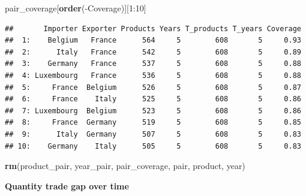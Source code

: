\documentclass[10pt,]{article}
\newenvironment{Shaded}{\begin{snugshade}}{\end{snugshade}}
\newcommand{\KeywordTok}[1]{\textcolor[rgb]{0.13,0.29,0.53}{\textbf{{#1}}}}
\newcommand{\DecValTok}[1]{\textcolor[rgb]{0.00,0.00,0.81}{{#1}}}
\newcommand{\NormalTok}[1]{{#1}}
\begin{document}
\begin{Shaded}
\begin{Highlighting}[]
\NormalTok{pair_coverage[}\KeywordTok{order}\NormalTok{(-Coverage)][}\DecValTok{1}\NormalTok{:}\DecValTok{10}\NormalTok{]}
\end{Highlighting}
\end{Shaded}

\begin{verbatim}
##       Importer Exporter Products Years T_products T_years Coverage
##  1:    Belgium   France      564     5        608       5     0.93
##  2:      Italy   France      542     5        608       5     0.89
##  3:    Germany   France      537     5        608       5     0.88
##  4: Luxembourg   France      536     5        608       5     0.88
##  5:     France  Belgium      526     5        608       5     0.87
##  6:     France    Italy      525     5        608       5     0.86
##  7: Luxembourg  Belgium      523     5        608       5     0.86
##  8:     France  Germany      519     5        608       5     0.85
##  9:      Italy  Germany      507     5        608       5     0.83
## 10:    Germany    Italy      505     5        608       5     0.83
\end{verbatim}

\begin{Shaded}
\begin{Highlighting}[]
\KeywordTok{rm}\NormalTok{(product_pair, year_pair, pair_coverage, pair, product, year)}
\end{Highlighting}
\end{Shaded}

\textbf{Quantity trade gap over time}
\end{document}
